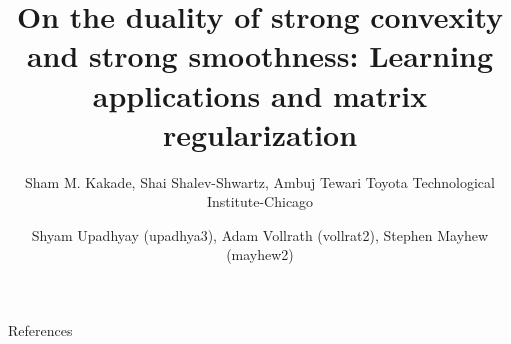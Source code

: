 \documentclass[11pt]{beamer}
\author{Sham M. Kakade, Shai Shalev-Shwartz, Ambuj Tewari \newline Toyota Technological Institute-Chicago}
\title{On the duality of strong convexity and strong smoothness: Learning applications and matrix regularization}
\date{Shyam Upadhyay (upadhya3), Adam Vollrath (vollrat2), Stephen Mayhew (mayhew2)}
\begin{document}
{\nologo
\begin{frame}
\titlepage
\end{frame}
}








\begin{frame}[allowframebreaks]{References}
  \def\newblock{}
  
  
\end{frame}
\end{document}

